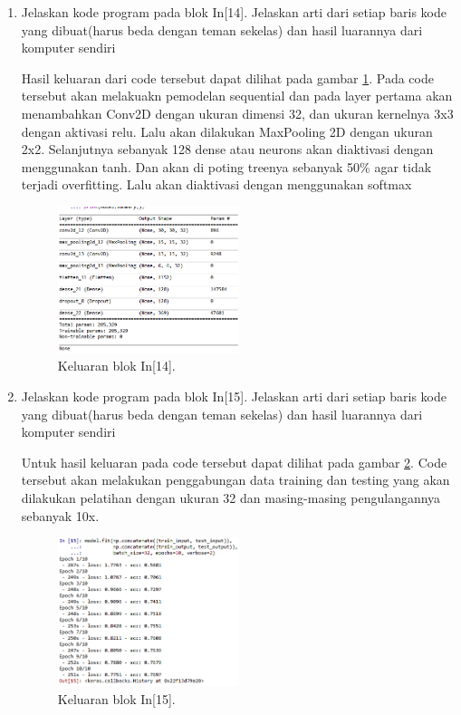 \begin{enumerate}
\item Jelaskan kode program pada blok In[14]. Jelaskan arti dari setiap baris kode yang dibuat(harus beda dengan teman sekelas) dan hasil luarannya dari komputer sendiri \par

Hasil keluaran dari code tersebut dapat dilihat pada gambar \ref{math14}. Pada code tersebut akan melakuakn pemodelan sequential dan pada layer pertama akan menambahkan Conv2D dengan ukuran dimensi 32, dan ukuran kernelnya 3x3 dengan aktivasi relu. Lalu akan dilakukan MaxPooling 2D dengan ukuran 2x2. Selanjutnya sebanyak 128 dense atau neurons akan diaktivasi dengan menggunakan tanh. Dan akan di poting treenya sebanyak 50\% agar tidak terjadi overfitting. Lalu akan diaktivasi dengan menggunakan softmax
		\begin{figure}[!htbp] 
		\centerline{\includegraphics[width=0.5\textwidth]{figures/im/math14.png}}
		\caption{Keluaran blok In[14].}
		\label{math14}
		\end{figure}

\item Jelaskan kode program pada blok In[15]. Jelaskan arti dari setiap baris kode yang dibuat(harus beda dengan teman sekelas) dan hasil luarannya dari komputer sendiri \par

Untuk hasil keluaran pada code tersebut dapat dilihat pada gambar \ref{math15}. Code tersebut akan melakukan penggabungan data training dan testing yang akan dilakukan pelatihan dengan ukuran 32 dan masing-masing pengulangannya sebanyak 10x.
		\begin{figure}[!htbp]
		\centerline{\includegraphics[width=0.5\textwidth]{figures/im/math15.png}}
		\caption{Keluaran blok In[15].}
		\label{math15}
		\end{figure}


\end{enumerate}
